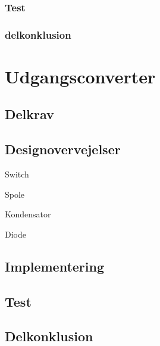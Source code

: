 \documentclass[../main.tex]{subfiles}
\begin{document}
        \subsubsection{Test}
            
        \subsubsection{delkonklusion}
            
            
                    
\section{Udgangsconverter}
        
    \subsection{Delkrav}
        
    \subsection{Designovervejelser}
            
            Switch

            Spole

            Kondensator

            Diode


            
    \subsection{Implementering}
        
    \subsection{Test}
        
    \subsection{Delkonklusion}
        
        
\end{document}
